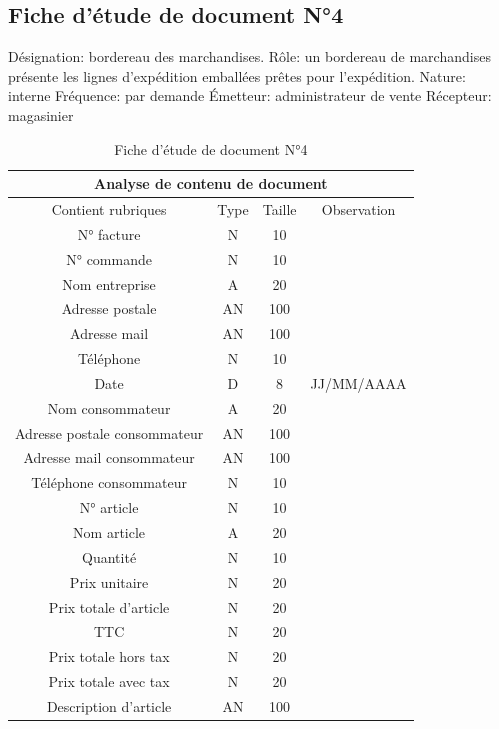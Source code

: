 \documentclass[edit,12pt,a4paper,ChapStyle,oneside,doubleinterligne]{report}
\begin{document}
\newpage
\subsection{Fiche d’étude de document N°4}
\noindent Désignation: bordereau des marchandises.
\newline Rôle: un bordereau de marchandises présente les lignes d'expédition emballées prêtes pour l'expédition.
\newline Nature: interne
\newline Fréquence: par demande
\newline Émetteur: administrateur de vente
\newline Récepteur: magasinier\cite{bordereau}
\begin{table}[h!]
    \centering
    \begin{tabular}{|c|c|c|c|}
         \hline
\multicolumn{4}{|c|}{Analyse de contenu de document}\\
\hline
Contient rubriques & Type & Taille & Observation\\
\hline
 N° facture  & N & 10 & \\
 N° commande  & N & 10 & \\
 Nom entreprise & A & 20 & \\
 Adresse postale & AN & 100 & \\
 Adresse mail & AN & 100 & \\
 Téléphone & N & 10 & \\
Date & D & 8 & JJ/MM/AAAA \\
Nom consommateur & A & 20 & \\
Adresse postale consommateur & AN & 100 & \\
Adresse mail consommateur & AN & 100 & \\
Téléphone consommateur & N & 10 & \\
N° article & N & 10 & \\
Nom article & A & 20 & \\
Quantité & N & 10 & \\
Prix unitaire & N & 20 & \\
Prix totale d’article & N & 20 & \\
TTC & N & 20 & \\
Prix totale hors tax & N & 20 & \\
Prix totale avec tax & N & 20 & \\
Description d’article & AN & 100 & \\
\hline
    \end{tabular}
    \caption{Fiche d’étude de document N°4}
    \label{tab:4}
\end{table}
\end{document}
